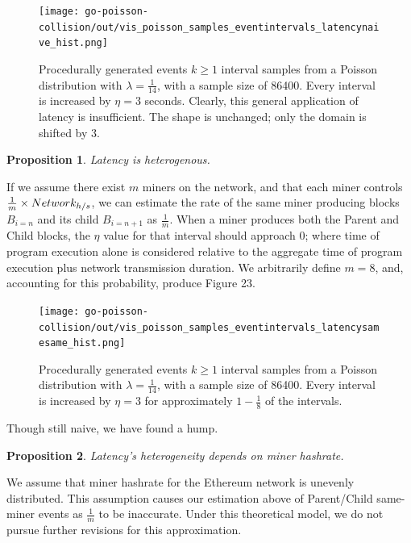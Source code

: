 \documentclass[11pt]{article}
\theoremstyle{plain}
\newtheorem{proposition}{Proposition}[section]
\begin{document}
\begin{figure}[tph]
    \centering
\texttt{[image: go-poisson-collision/out/vis\_poisson\_samples\_eventintervals\_latencynaive\_hist.png]}
    \caption{
      Procedurally generated events $k \geq 1$ interval samples from a Poisson distribution
with $\lambda = \frac{1}{14}$, with a sample size of 86400.
      Every interval is increased by $\eta=3$ seconds.
    Clearly, this general application of latency is insufficient.
    The shape is unchanged; only the domain is shifted by $3$.
    }
\end{figure}

\vspace{5mm}
\begin{proposition}
  Latency is heterogenous.
\end{proposition}

If we assume there exist $m$ miners on the network, and that each miner 
controls $\frac{1}{m} \times Network_{h/s}$, we can estimate the rate of the 
same miner producing blocks $B_{i=n}$ and its child $B_{i=n+1}$ as 
$\frac{1}{m}$.
When a miner produces both the Parent and Child blocks, the $\eta$ value for
that interval should approach $0$; where time of program execution alone is 
considered relative to the aggregate time of program execution plus network 
transmission duration.
We arbitrarily define $m=8$, and, accounting for this probability, produce 
Figure 23.

\begin{figure}[tph]
    \centering

\texttt{[image: go-poisson-collision/out/vis\_poisson\_samples\_eventintervals\_latencysamesame\_hist.png]}
    \caption{
      Procedurally generated events $k \geq 1$ interval samples from a Poisson distribution
with $\lambda = \frac{1}{14}$, with a sample size of 86400.
      Every interval is increased by $\eta=3$ for approximately
$1-\frac{1}{8}$ of the intervals.
    }
\end{figure}

Though still naive, we have found a hump.

\vspace{5mm}
\begin{proposition}
  Latency's heterogeneity depends on miner hashrate. %
\end{proposition}

We assume that miner hashrate for the Ethereum network is unevenly distributed.
This assumption causes our estimation above of Parent/Child same-miner events
as $\frac{1}{m}$ to be inaccurate.
Under this theoretical model, we do not pursue further revisions for this
approximation.
\end{document}
